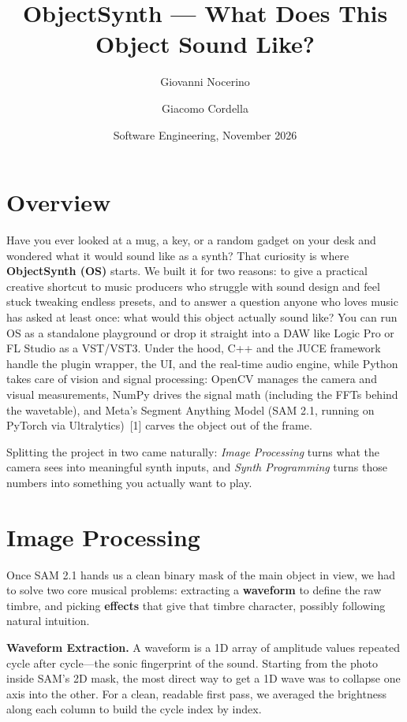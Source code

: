 \documentclass[10pt,a4paper]{article}
\title{\vspace{-2.4em}\textbf{ObjectSynth} --- What Does This Object Sound Like?}
\author{Giovanni Nocerino \and Giacomo Cordella}
\date{\vspace{-0.8em}Software Engineering, November 2026}
\begin{document}
\maketitle
\vspace{-1.8em}

\section*{Overview}
Have you ever looked at a mug, a key, or a random gadget on your desk and wondered what it would sound like as a synth? That curiosity is where \textbf{ObjectSynth (OS)} starts. We built it for two reasons: to give a practical creative shortcut to music producers who struggle with sound design and feel stuck tweaking endless presets, and to answer a question anyone who loves music has asked at least once: what would this object actually sound like? You can run OS as a standalone playground or drop it straight into a DAW like Logic Pro or FL Studio as a VST/VST3. Under the hood, C++ and the JUCE framework handle the plugin wrapper, the UI, and the real-time audio engine, while Python takes care of vision and signal processing: OpenCV manages the camera and visual measurements, NumPy drives the signal math (including the FFTs behind the wavetable), and Meta's Segment Anything Model (SAM 2.1, running on PyTorch via Ultralytics)~[1] carves the object out of the frame.

Splitting the project in two came naturally: \emph{Image Processing} turns what the camera sees into meaningful synth inputs, and \emph{Synth Programming} turns those numbers into something you actually want to play.

\section*{Image Processing}
Once SAM 2.1 hands us a clean binary mask of the main object in view, we had to solve two core musical problems: extracting a \textbf{waveform} to define the raw timbre, and picking \textbf{effects} that give that timbre character, possibly following natural intuition.

\textbf{Waveform Extraction.} A waveform is a 1D array of amplitude values repeated cycle after cycle---the sonic fingerprint of the sound. Starting from the photo inside SAM's 2D mask, the most direct way to get a 1D wave was to collapse one axis into the other. For a clean, readable first pass, we averaged the brightness along each column to build the cycle index by index.
\end{document}
